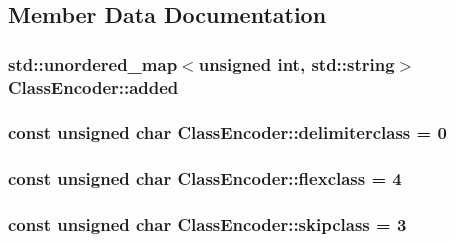 \subsection{Member Data Documentation}
\hypertarget{classClassEncoder_adcdcf6dc84a1c3ca056f3687b2d3688c}{}
\subsubsection[{added}]{\setlength{\rightskip}{0pt plus 5cm}std\+::unordered\+\_\+map$<$unsigned int, std\+::string$>$ Class\+Encoder\+::added}\label{classClassEncoder_adcdcf6dc84a1c3ca056f3687b2d3688c}
\hypertarget{classClassEncoder_a644f99132d9b6f5be6f645b40784b170}{}
\subsubsection[{delimiterclass}]{\setlength{\rightskip}{0pt plus 5cm}const unsigned char Class\+Encoder\+::delimiterclass = 0\hspace{0.3cm}{\ttfamily [static]}}\label{classClassEncoder_a644f99132d9b6f5be6f645b40784b170}
\hypertarget{classClassEncoder_a87e9e57927ca8c80c53612465aa8802d}{}
\subsubsection[{flexclass}]{\setlength{\rightskip}{0pt plus 5cm}const unsigned char Class\+Encoder\+::flexclass = 4\hspace{0.3cm}{\ttfamily [static]}}\label{classClassEncoder_a87e9e57927ca8c80c53612465aa8802d}
\hypertarget{classClassEncoder_a645b97d98a788a150f2458db90282276}{}
\subsubsection[{skipclass}]{\setlength{\rightskip}{0pt plus 5cm}const unsigned char Class\+Encoder\+::skipclass = 3\hspace{0.3cm}{\ttfamily [static]}}\label{classClassEncoder_a645b97d98a788a150f2458db90282276}
\hypertarget{classClassEncoder_a4a99bcd37707a9d26707e45728ee7c1d}{}
